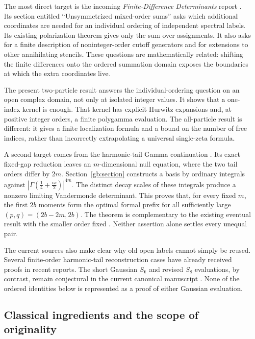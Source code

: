 The most direct target is the incoming \emph{Finite-Difference
Determinants} report \cite{repo:finite}. Its section entitled
``Unsymmetrized mixed-order sums'' asks which additional coordinates are
needed for an individual ordering of independent spectral labels.
Its existing polarization theorem gives only the sum over assignments.
It also asks for a finite description of noninteger-order cutoff
generators and for extensions to other annihilating stencils. These
questions are mathematically related: shifting the finite differences
onto the ordered summation domain exposes the boundaries at which
the extra coordinates live.

The present two-particle result answers the individual-ordering question
on an open complex domain, not only at isolated integer values.
It shows that a one-index kernel is enough. That kernel has explicit
Hurwitz expansions and, at positive integer orders, a finite polygamma
evaluation. The all-particle result is different: it gives a finite
localization formula and a bound on the number of free indices, rather
than incorrectly extrapolating a universal single-zeta formula.

A second target comes from the harmonic-tail Gamma continuation
\cite{repo-gamma}. Its exact fixed-gap reduction leaves an
$m$-dimensional null equation, where the two tail orders differ by
$2m$. Section~\ref{gb:section} constructs a basis by ordinary integrals
against $|\Gamma(\tfrac14+\tfrac{ix}{2})|^{4m}$. The distinct
decay scales of these integrals produce a nonzero limiting Vandermonde
determinant. This proves that, for every fixed $m$, the first $2b$
moments form the optimal formal prefix for all sufficiently large
$(p,q)=(2b-2m,2b)$. The theorem is complementary to the existing
eventual result with the smaller order fixed \cite{repo:quartic}. Neither assertion alone
settles every unequal pair.

The current sources also make clear why old open labels cannot simply
be reused. Several finite-order harmonic-tail reconstruction cases have
already received proofs in recent reports. The short Gaussian $S_6$
and revised $S_8$ evaluations, by contrast, remain conjectural in the
current canonical manuscript \cite{repo:ledger,repo:gaussian}. None of
the ordered identities below is represented as a proof of either
Gaussian evaluation.

\subsection{Classical ingredients and the scope of originality}


